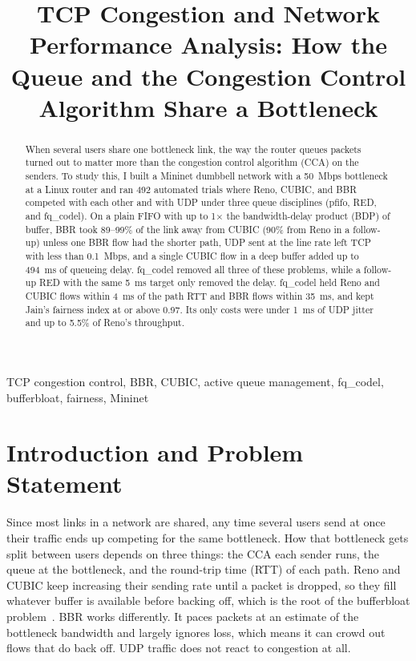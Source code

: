 \documentclass[conference,12pt,letterpaper]{IEEEtran}
\newcommand{\x}{\ensuremath{\times}}
\begin{document}
\title{TCP Congestion and Network Performance Analysis: How the Queue and the Congestion Control Algorithm Share a Bottleneck}

\author{
}

\maketitle

\begin{abstract}
When several users share one bottleneck link, the way the router queues packets turned out to matter more than the congestion control algorithm (CCA) on the senders. To study this, I built a Mininet dumbbell network with a 50~Mbps bottleneck at a Linux router and ran 492 automated trials where Reno, CUBIC, and BBR competed with each other and with UDP under three queue disciplines (pfifo, RED, and fq\_codel). On a plain FIFO with up to 1\x{} the bandwidth-delay product (BDP) of buffer, BBR took 89--99\% of the link away from CUBIC (90\% from Reno in a follow-up) unless one BBR flow had the shorter path, UDP sent at the line rate left TCP with less than 0.1~Mbps, and a single CUBIC flow in a deep buffer added up to 494~ms of queueing delay. fq\_codel removed all three of these problems, while a follow-up RED with the same 5~ms target only removed the delay. fq\_codel held Reno and CUBIC flows within 4~ms of the path RTT and BBR flows within 35~ms, and kept Jain's fairness index at or above 0.97. Its only costs were under 1~ms of UDP jitter and up to 5.5\% of Reno's throughput.
\end{abstract}

\begin{IEEEkeywords}
TCP congestion control, BBR, CUBIC, active queue management, fq\_codel, bufferbloat, fairness, Mininet
\end{IEEEkeywords}

\section{Introduction and Problem Statement}

Since most links in a network are shared, any time several users send at once their traffic ends up competing for the same bottleneck. How that bottleneck gets split between users depends on three things: the CCA each sender runs, the queue at the bottleneck, and the round-trip time (RTT) of each path. Reno and CUBIC keep increasing their sending rate until a packet is dropped, so they fill whatever buffer is available before backing off, which is the root of the bufferbloat problem~\cite{gettys}. BBR works differently. It paces packets at an estimate of the bottleneck bandwidth and largely ignores loss, which means it can crowd out flows that do back off. UDP traffic does not react to congestion at all.
\end{document}
